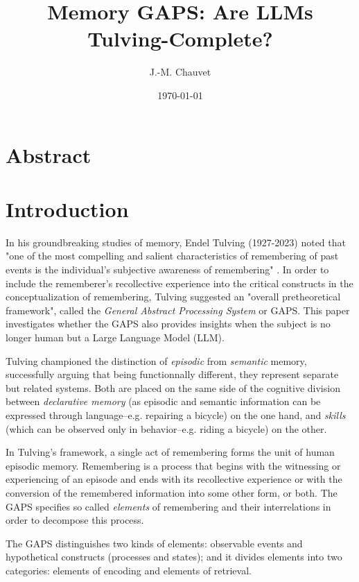 \documentclass[11pt]{article}
\author{J.-M. Chauvet}
\date{\today}
\title{Memory GAPS: Are LLMs Tulving-Complete?}
\begin{document}
\maketitle

\section*{Abstract}
\label{sec:orgcc84017}
\section*{Introduction}
\label{sec:org0f17253}
In his groundbreaking studies of memory, Endel Tulving (1927-2023) noted that "one of the most compelling and salient characteristics of remembering of past events is the individual's subjective awareness of remembering" \citep{Tulving1983}. In order to include the rememberer's recollective experience into the critical constructs in the conceptualization of remembering, Tulving suggested an "overall pretheoretical framework", called the \emph{General Abstract Processing System} or GAPS. This paper investigates whether the GAPS also provides insights when the subject is no longer human but a Large Language Model (LLM).

Tulving championed the distinction of \emph{episodic} from \emph{semantic} memory, successfully arguing that being functionnally different, they represent separate but related systems. Both are placed on the same side of the cognitive division between \emph{declarative memory} (as episodic and semantic information can be expressed through language--e.g. repairing a bicycle) on the one hand, and \emph{skills} (which can be observed only in behavior--e.g. riding a bicycle) on the other.

In Tulving's framework, a single act of remembering forms the unit of human episodic memory. Remembering is a process that begins with the witnessing or experiencing of an episode and ends with its recollective experience or with the conversion of the remembered information into some other form, or both. The GAPS specifies so called \emph{elements} of remembering and their interrelations in order to decompose this process.

The GAPS distinguishes two kinds of elements: observable events and hypothetical constructs (processes and states); and it divides elements into two categories: elements of encoding and elements of retrieval.
\end{document}
